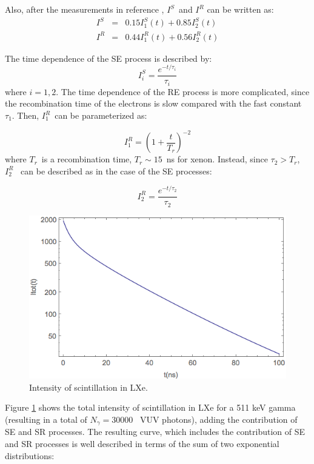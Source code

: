 \documentclass[review]{elsarticle}
\begin{document}
Also, after the measurements in reference \cite{Kubota79}, $I^S$~and $I^R$ can be written as:
\begin{eqnarray}
I^S & = & 0.15 I_1^S(t) +  0.85 I_2^S(t) \\
 I^R & = & 0.44 I_1^R(t) +  0.56 I_2^R(t)
\end{eqnarray}

The time dependence of the SE process is described by:
\begin{equation}
I^S_i = \frac{e^{-t/\tau_i}}{\tau_i}
\end{equation}
%
where $i=1,2$. The time dependence of the RE process is more complicated, since the recombination time
of the electrons is slow compared with the fast constant $\tau_1$. Then, $I^R_1$~can be parameterized \cite{Kubota79} as: 

\begin{equation}
I^R_1 =(1 + \frac{t}{T_r})^{-2}
\end{equation}
%
where $T_r$~is a recombination time, $T_r \sim 15$~ns for xenon. Instead, since $\tau_2 > T_r$, $I^R_2$~ can be described as in the case of the SE processes: 

\begin{equation}
I^R_2 =\frac{e^{-t/\tau_2}}{\tau_2}
\end{equation}

\begin{figure}[!bhtp]
	\centering
	\includegraphics[scale=0.6]{../img/LXeScintillation2.png}
	\caption{\label{fig.scint} Intensity of scintillation in LXe. }
\end{figure}

Figure \ref{fig.scint} shows the total intensity of scintillation in LXe for a 511 keV gamma (resulting in a total of $N_\gamma =30000$~ VUV photons), adding the contribution of SE and SR processes. The resulting curve, which includes the contribution of SE and SR processes is well described in terms of the sum of two exponential distributions: 
\end{document}
